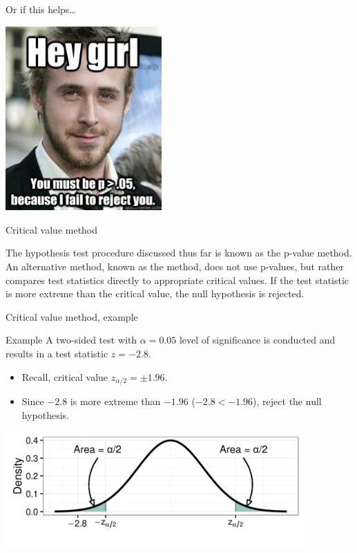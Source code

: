 \documentclass[xcolor=table, aspectratio=169, bigger, handout]{beamer}
\begin{document}
\begin{frame}{Or if this helps\ldots}

{\centering
\includegraphics[width=2.35in]{../images/ch08_p_value_meme}
\par}

\end{frame}

\begin{frame}{Critical value method}
\begin{block}{}
The hypothesis test procedure discussed thus far is known as the p-value method. An alternative method, known as the  method, does not use p-values, but rather compares test statistics directly to appropriate critical values. If the test statistic is more extreme than the critical value, the null hypothesis is rejected.
\end{block}
\end{frame}

\begin{frame}{Critical value method, example}
\begin{exampleblock}{Example}
A two-sided test with $\alpha = 0.05$ level of significance is conducted and results in a test statistic $z= - 2.8$.
\begin{itemize}
\item Recall, critical value $z_{\alpha/2} = \pm 1.96$.
\item Since $-2.8$ is more extreme than $-1.96$ ($-2.8 < -1.96$), reject the null hypothesis.
\end{itemize} 
\end{exampleblock}

\medskip
{\centering
\includegraphics[width=4.5in]{../images/ch08_cv}
\par}

\end{frame}
\end{document}
